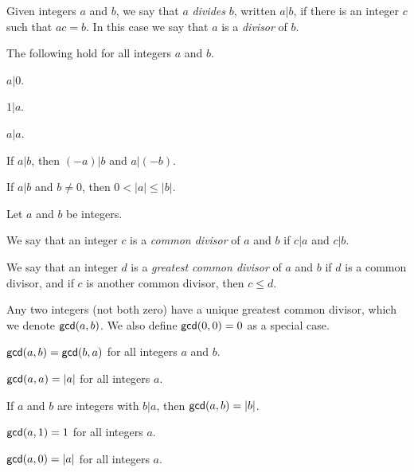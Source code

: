 \begin{dfn}[Divides]
Given integers \(a\) and \(b\), we say that \(a\) \emph{divides} \(b\), written \(a|b\), if there is an integer \(c\) such that \(ac = b\).
In this case we say that \(a\) is a \emph{divisor} of \(b\).
\end{dfn}

\begin{prop}
The following hold for all integers \(a\) and \(b\).
\begin{proplist*}
\item \(a|0\).
\item \(1|a\).
\item \(a|a\).
\item If \(a|b\), then \((-a)|b\) and \(a|(-b)\).
\item If \(a|b\) and \(b \neq 0\), then \(0 < |a| \leq |b|\).
\end{proplist*}
\end{prop}

\begin{dfn}
Let \(a\) and \(b\) be integers.
\begin{proplist}
\item We say that an integer \(c\) is a \emph{common divisor} of \(a\) and \(b\) if \(c|a\) and \(c|b\).
\item We say that an integer \(d\) is a \emph{greatest common divisor} of \(a\) and \(b\) if \(d\) is a common divisor, and if \(c\) is another common divisor, then \(c \leq d\).
\end{proplist}
\end{dfn}

\begin{prop}
Any two integers (not both zero) have a unique greatest common divisor, which we denote \(\mathsf{gcd}(a, b)\).
We also define \(\mathsf{gcd}(0, 0) = 0\) as a special case.
\end{prop}

\begin{prop} \mbox{}
\begin{proplist*}
\item \(\mathsf{gcd}(a, b) = \mathsf{gcd}(b, a)\) for all integers \(a\) and \(b\).
\item \(\mathsf{gcd}(a, a) = |a|\) for all integers \(a\).
\item If \(a\) and \(b\) are integers with \(b|a\), then \(\mathsf{gcd}(a, b) = |b|\).
\item \(\mathsf{gcd}(a, 1) = 1\) for all integers \(a\).
\item \(\mathsf{gcd}(a, 0) = |a|\) for all integers \(a\).
\end{proplist*}
\end{prop}


